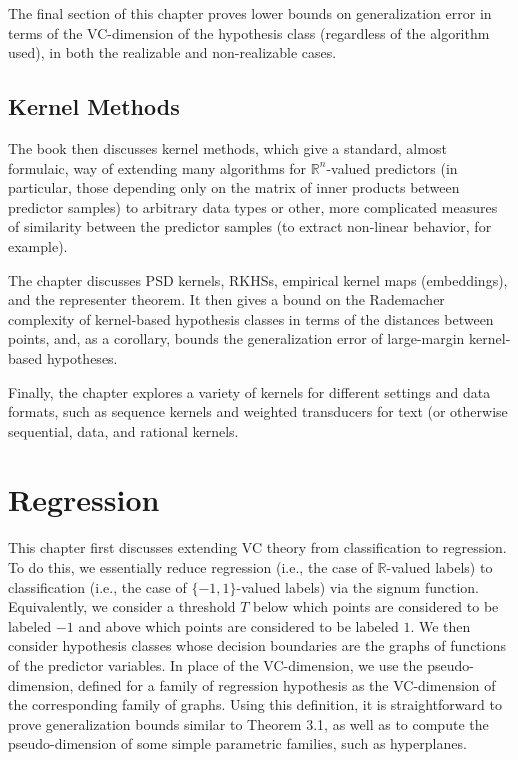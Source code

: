 \documentclass{article} %
\newcommand{\R}{\mathbb{R}}                         %
\begin{document}
The final section of this chapter proves lower bounds on generalization error
in terms of the VC-dimension of the hypothesis class (regardless of the
algorithm used), in both the realizable and non-realizable cases.

\subsection{Kernel Methods}
The book then discusses kernel methods, which give a standard, almost
formulaic, way of extending many algorithms for $\R^n$-valued predictors (in
particular, those depending only on the matrix of inner products between
predictor samples) to arbitrary data types or other, more complicated measures
of similarity between the predictor samples (to extract non-linear behavior,
for example).

The chapter discusses PSD kernels, RKHSs, empirical kernel maps (embeddings),
and the representer theorem. It then gives a bound on the Rademacher complexity
of kernel-based hypothesis classes in terms of the distances between points,
and, as a corollary, bounds the generalization error of large-margin
kernel-based hypotheses.

Finally, the chapter explores a variety of kernels for different settings and
data formats, such as sequence kernels and weighted transducers for text (or
otherwise sequential, data, and rational kernels.

\section{Regression}
\label{sec:reg}

This chapter first discusses extending VC theory from classification to
regression. To do this, we essentially reduce regression (i.e., the case of
$\R$-valued labels) to classification (i.e., the case of $\{-1,1\}$-valued
labels) via the signum function. Equivalently, we consider a threshold $T$
below which points are considered to be labeled $-1$ and above which points are
considered to be labeled $1$. We then consider hypothesis classes whose
decision boundaries are the graphs of functions of the predictor variables. In
place of the VC-dimension, we use the pseudo-dimension, defined for a family of
regression hypothesis as the VC-dimension of the corresponding family of
graphs.
Using this definition, it is straightforward to prove generalization bounds
similar to Theorem 3.1, as well as to compute the pseudo-dimension of some
simple parametric families, such as hyperplanes.
\end{document}
